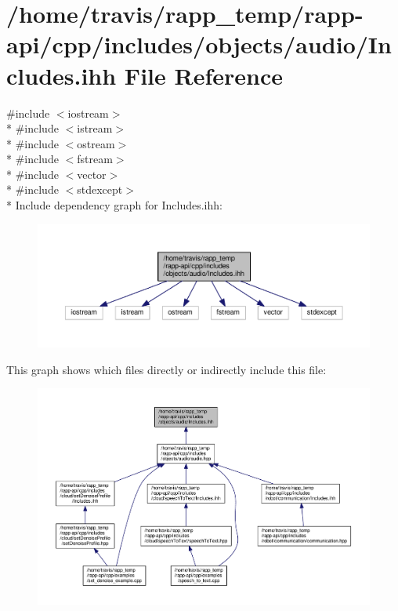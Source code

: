 \hypertarget{objects_2audio_2Includes_8ihh}{\section{/home/travis/rapp\-\_\-temp/rapp-\/api/cpp/includes/objects/audio/\-Includes.ihh File Reference}
\label{objects_2audio_2Includes_8ihh}
}
{\ttfamily \#include $<$iostream$>$}\\*
{\ttfamily \#include $<$istream$>$}\\*
{\ttfamily \#include $<$ostream$>$}\\*
{\ttfamily \#include $<$fstream$>$}\\*
{\ttfamily \#include $<$vector$>$}\\*
{\ttfamily \#include $<$stdexcept$>$}\\*
Include dependency graph for Includes.\-ihh\-:
\nopagebreak
\begin{figure}[H]
\begin{center}
\leavevmode
\includegraphics[width=350pt]{objects_2audio_2Includes_8ihh__incl}
\end{center}
\end{figure}
This graph shows which files directly or indirectly include this file\-:
\nopagebreak
\begin{figure}[H]
\begin{center}
\leavevmode
\includegraphics[width=350pt]{objects_2audio_2Includes_8ihh__dep__incl}
\end{center}
\end{figure}
